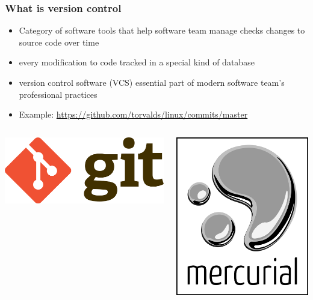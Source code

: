 \documentclass[12pt]{beamer}
\begin{document}
\begin{frame}
\frametitle{What is version control}
\begin{itemize}
	\item Category of software tools that help software team manage checks changes to source code over time
	\item every modification to code tracked in a special kind of database
	\item version control software (VCS) essential part of modern software team's professional practices
	\item Example: \url{https://github.com/torvalds/linux/commits/master}
\end{itemize}

\begin{columns}
	\begin{column}{0.33\linewidth}
		\includegraphics[width=0.8\linewidth]{git_logo}
	\end{column}
	\begin{column}{0.33\linewidth}
		\includegraphics[width=0.8\linewidth]{mercurial_logo}

\end{column}
\end{columns}
\end{frame}
\end{document}

